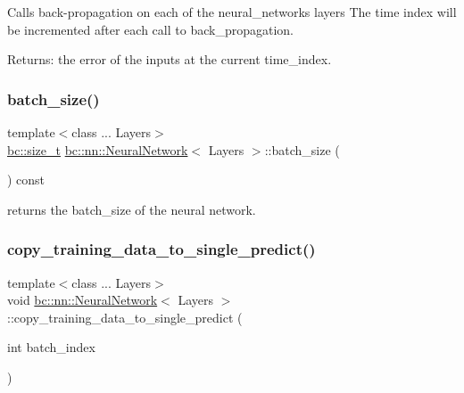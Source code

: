 Calls back-\/propagation on each of the neural\+\_\+network\textquotesingle{}s layers The time index will be incremented after each call to back\+\_\+propagation. 

Returns\+: the error of the inputs at the current time\+\_\+index. \mbox{\label{structbc_1_1nn_1_1NeuralNetwork_a94b394fdf99d41f16ce04585f939927f}} 
\subsubsection{\texorpdfstring{batch\+\_\+size()}{batch\_size()}}
{\footnotesize\ttfamily template$<$class ... Layers$>$ \\
\hyperlink{namespacebc_aaf8e3fbf99b04b1b57c4f80c6f55d3c5}{bc\+::size\+\_\+t} \hyperlink{structbc_1_1nn_1_1NeuralNetwork}{bc\+::nn\+::\+Neural\+Network}$<$ Layers $>$\+::batch\+\_\+size (\begin{DoxyParamCaption}{ }\end{DoxyParamCaption}) const\hspace{0.3cm}{\ttfamily [inline]}}



returns the batch\+\_\+size of the neural network. 

\mbox{\label{structbc_1_1nn_1_1NeuralNetwork_acb6527b25dade7c62d27dcddfed04a2c}} 
\subsubsection{\texorpdfstring{copy\+\_\+training\+\_\+data\+\_\+to\+\_\+single\+\_\+predict()}{copy\_training\_data\_to\_single\_predict()}}
{\footnotesize\ttfamily template$<$class ... Layers$>$ \\
void \hyperlink{structbc_1_1nn_1_1NeuralNetwork}{bc\+::nn\+::\+Neural\+Network}$<$ Layers $>$\+::copy\+\_\+training\+\_\+data\+\_\+to\+\_\+single\+\_\+predict (\begin{DoxyParamCaption}\item[{int}]{batch\+\_\+index }\end{DoxyParamCaption})\hspace{0.3cm}{\ttfamily [inline]}}



